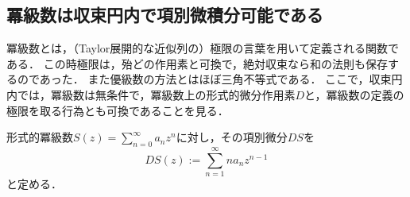 \documentclass[uplatex, dvipdfmx]{jsreport}
\begin{document}
\subsection{冪級数は収束円内で項別微積分可能である}

\begin{screen}
    冪級数とは，（Taylor展開的な近似列の）極限の言葉を用いて定義される関数である．
    この時極限は，殆どの作用素と可換で，絶対収束なら和の法則も保存するのであった．
    また優級数の方法とはほぼ三角不等式である．
    ここで，収束円内では，冪級数は無条件で，冪級数上の形式的微分作用素$D$と，冪級数の定義の極限を取る行為とも可換であることを見る．
\end{screen}

\begin{definition}
    形式的冪級数$S(z)=\sum^\infty_{n=0}a_nz^n$に対し，その項別微分$DS$を
    \[ DS(z):=\sum^\infty_{n=1}na_nz^{n-1} \]
    と定める．
\end{definition}
\end{document}
